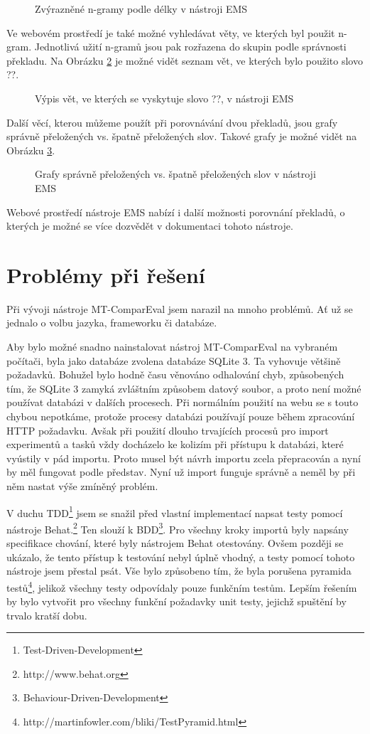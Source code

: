 \begin{figure}
  \caption{Zvýrazněné \mbox{n-gramy} podle délky v nástroji EMS}
  \label{img:ems-sentence}
\end{figure}

Ve webovém prostředí je také možné vyhledávat věty,
  ve kterých byl použit \mbox{n-gram}.
Jednotlivá užití \mbox{n-gramů} jsou pak rozřazena do skupin podle správnosti překladu.
Na Obrázku \ref{img:ems-word} je možné vidět seznam vět,
  ve kterých bylo použito slovo ??.

\begin{figure}
  \caption{Výpis vět, ve kterých se vyskytuje slovo ??, v nástroji EMS}
  \label{img:ems-word}
\end{figure}

Další věcí, kterou můžeme použít při porovnávání dvou překladů,
  jsou grafy správně přeložených vs. špatně přeložených slov.
Takové grafy je možné vidět na Obrázku \ref{img:ems-charts}.

\begin{figure}
  \caption{Grafy správně přeložených vs. špatně přeložených slov v nástroji EMS}
  \label{img:ems-charts}
\end{figure}

Webové prostředí nástroje EMS nabízí i další možnosti porovnání překladů,
  o kterých je možné se více dozvědět v dokumentaci tohoto nástroje.

\section{Problémy při řešení}
Při vývoji nástroje MT-ComparEval jsem narazil na mnoho problémů.
Ať už se jednalo o volbu jazyka, frameworku či databáze.

Aby bylo možné snadno nainstalovat nástroj MT-ComparEval na vybraném počítači,
  byla jako databáze zvolena databáze SQLite 3.
Ta vyhovuje většině požadavků.
Bohužel bylo hodně času věnováno odhalování chyb,
  způsobených tím,
  že SQLite 3 zamyká zvláštním způsobem datový soubor,
  a proto není možné používat databázi v dalších procesech.
Při normálním použití na webu se s touto chybou nepotkáme,
  protože procesy databázi používají pouze během zpracování HTTP požadavku.
Avšak při použití dlouho trvajících procesů pro import experimentů a tasků
  vždy docházelo ke kolizím při přístupu k databázi,
  které vyústily v pád importu.
Proto musel být návrh importu zcela přepracován a nyní by měl fungovat podle představ.
Nyní už import funguje správně a neměl by při něm nastat výše zmíněný problém.


V duchu TDD\footnote{Test-Driven-Development}
  jsem se snažil před vlastní implementací napsat testy pomocí nástroje Behat.\footnote{http://www.behat.org}
Ten slouží k BDD\footnote{Behaviour-Driven-Development}.
Pro všechny kroky importů byly napsány specifikace chování, které byly nástrojem Behat otestovány.
Ovšem později se ukázalo, že tento přístup k testování nebyl úplně vhodný, a testy pomocí tohoto nástroje jsem přestal psát.
Vše bylo způsobeno tím, že byla porušena pyramida testů\footnote{http://martinfowler.com/bliki/TestPyramid.html},
  jelikož všechny testy odpovídaly pouze funkčním testům.
Lepším řešením by bylo vytvořit pro všechny funkční požadavky unit testy,
  jejichž spuštění by trvalo kratší dobu.
